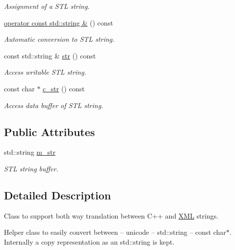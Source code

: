 \begin{DoxyCompactItemize}
\begin{DoxyCompactList}\small\item\em Assignment of a S\+TL string. \end{DoxyCompactList}\item 
\hyperlink{class_d_d4hep_1_1_x_m_l_1_1_tag__t_aac5fcbab32da998df43084e6de3666c5}{operator const std\+::string \&} () const
\begin{DoxyCompactList}\small\item\em Automatic conversion to S\+TL string. \end{DoxyCompactList}\item 
const std\+::string \& \hyperlink{class_d_d4hep_1_1_x_m_l_1_1_tag__t_a05943049115d80e4de64e7eb7c7a6798}{str} () const
\begin{DoxyCompactList}\small\item\em Access writable S\+TL string. \end{DoxyCompactList}\item 
const char $\ast$ \hyperlink{class_d_d4hep_1_1_x_m_l_1_1_tag__t_aae61fda0d31d078cf195a4446fc771a0}{c\+\_\+str} () const
\begin{DoxyCompactList}\small\item\em Access data buffer of S\+TL string. \end{DoxyCompactList}\end{DoxyCompactItemize}
\subsection*{Public Attributes}
\begin{DoxyCompactItemize}
\item 
std\+::string \hyperlink{class_d_d4hep_1_1_x_m_l_1_1_tag__t_aab9eff18240d6d98b8d8063792198e91}{m\+\_\+str}
\begin{DoxyCompactList}\small\item\em S\+TL string buffer. \end{DoxyCompactList}\end{DoxyCompactItemize}


\subsection{Detailed Description}
Class to support both way translation between C++ and \hyperlink{namespace_d_d4hep_1_1_x_m_l}{X\+ML} strings. 

Helper class to easily convert between -- unicode -- std\+::string -- const char$\ast$. Internally a copy representation as an std\+::string is kept.

